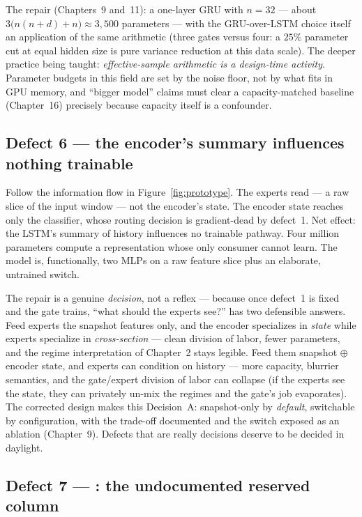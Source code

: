 The repair (Chapters~9 and~11): a one-layer GRU with $n = 32$
--- about $3\bigl(n(n+d)+n\bigr) \approx 3{,}500$ parameters --- with the
GRU-over-LSTM choice itself an application of the same arithmetic (three
gates versus four: a $25\%$ parameter cut at equal hidden size is pure
variance reduction at this data scale). The deeper practice being taught:
\emph{effective-sample arithmetic is a design-time activity}. Parameter
budgets in this field are set by the noise floor, not by what fits in GPU
memory, and ``bigger model'' claims must clear a capacity-matched baseline
(Chapter~16) precisely because capacity itself is a confounder.

\subsection*{Defect 6 --- the encoder's summary influences nothing
trainable}

Follow the information flow in Figure~\ref{fig:prototype}. The experts read
 --- a raw slice of the input window --- not the
encoder's state. The encoder state reaches only the classifier, whose
routing decision is gradient-dead by defect~1. Net effect: the LSTM's
summary of history influences no trainable pathway. Four million parameters
compute a representation whose only consumer cannot learn. The model is,
functionally, two MLPs on a raw feature slice plus an elaborate,
untrained switch.

The repair is a genuine \emph{decision}, not a reflex --- because once
defect~1 is fixed and the gate trains, ``what should the experts see?''
has two defensible answers. Feed experts the snapshot features only, and
the encoder specializes in \emph{state} while experts specialize in
\emph{cross-section} --- clean division of labor, fewer parameters, and the
regime interpretation of Chapter~2 stays legible. Feed them snapshot
$\oplus$ encoder state, and experts can condition on history --- more
capacity, blurrier semantics, and the gate/expert division of labor can
collapse (if the experts see the state, they can privately un-mix the
regimes and the gate's job evaporates). The corrected design makes this
Decision~A: snapshot-only by \emph{default}, switchable by configuration,
with the trade-off documented and the switch exposed as an ablation
(Chapter~9). Defects that are really decisions deserve to be decided in
daylight.

\subsection*{Defect 7 --- : the undocumented reserved
column}

